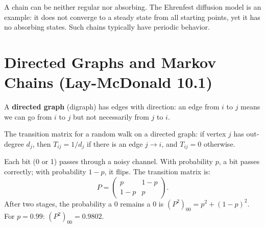\begin{remark}
A chain can be neither regular nor absorbing. The Ehrenfest diffusion model is an example: it does not converge to a steady state from all starting points, yet it has no absorbing states. Such chains typically have periodic behavior.
\end{remark}

\section{Directed Graphs and Markov Chains (Lay-McDonald 10.1)}

\begin{definition}
A \textbf{directed graph} (digraph) has edges with direction: an edge from $i$ to $j$ means we can go from $i$ to $j$ but not necessarily from $j$ to $i$.
\end{definition}

The transition matrix for a random walk on a directed graph: if vertex $j$ has out-degree $d_j$, then $T_{ij}=1/d_j$ if there is an edge $j\to i$, and $T_{ij}=0$ otherwise.

\begin{example}
Each bit (0 or 1) passes through a noisy channel. With probability $p$, a bit passes correctly; with probability $1-p$, it flips. The transition matrix is:
\[
P=\begin{pmatrix}p&1-p\\1-p&p\end{pmatrix}.
\]
After two stages, the probability a 0 remains a 0 is $(P^2)_{00}=p^2+(1-p)^2$. For $p=0.99$: $(P^2)_{00}=0.9802$.
\end{example}

